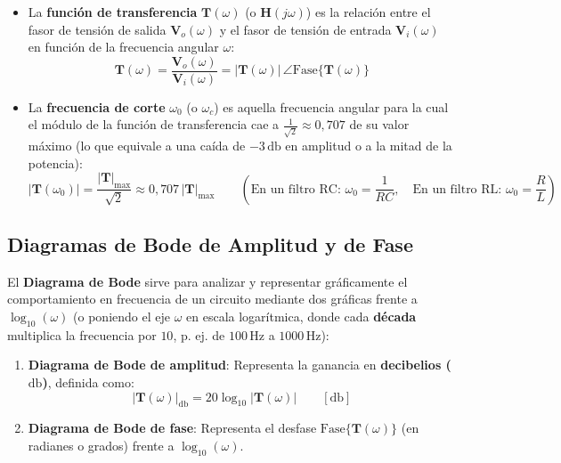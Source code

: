 \begin{definicion}
\begin{itemize}
    \item La \textbf{función de transferencia} $\mathbf{T}(\omega)$ (o $\mathbf{H}(j\omega)$) es la relación entre el fasor de tensión de salida $\mathbf{V}_o(\omega)$ y el fasor de tensión de entrada $\mathbf{V}_i(\omega)$ en función de la frecuencia angular $\omega$:
    \begin{equation}
        \boxed{\mathbf{T}(\omega) = \frac{\mathbf{V}_o(\omega)}{\mathbf{V}_i(\omega)} = |\mathbf{T}(\omega)|\,\angle\text{Fase}\{\mathbf{T}(\omega)\}}
    \end{equation}
    \item La \textbf{frecuencia de corte} $\omega_0$ (o $\omega_c$) es aquella frecuencia angular para la cual el módulo de la función de transferencia cae a $\frac{1}{\sqrt{2}} \approx 0{,}707$ de su valor máximo (lo que equivale a una caída de $-3\,\si{\decibel}$ en amplitud o a la mitad de la potencia):
    \begin{equation}
        |\mathbf{T}(\omega_0)| = \frac{|\mathbf{T}|_{\max}}{\sqrt{2}} \approx 0{,}707\,|\mathbf{T}|_{\max} \qquad \left(\text{En un filtro RC: } \boxed{\omega_0 = \frac{1}{R C}}, \quad \text{En un filtro RL: } \boxed{\omega_0 = \frac{R}{L}}\right)
    \end{equation}
\end{itemize}
\end{definicion}

\subsection{Diagramas de Bode de Amplitud y de Fase}

El \textbf{Diagrama de Bode} sirve para analizar y representar gráficamente el comportamiento en frecuencia de un circuito mediante dos gráficas frente a $\log_{10}(\omega)$ (o poniendo el eje $\omega$ en escala logarítmica, donde cada \textbf{década} multiplica la frecuencia por $10$, p. ej. de $100\,\si{\hertz}$ a $1000\,\si{\hertz}$):
\begin{enumerate}
    \item \textbf{Diagrama de Bode de amplitud}: Representa la ganancia en \textbf{decibelios ($\si{\decibel}$)}, definida como:
    \begin{equation}
        |\mathbf{T}(\omega)|_{\si{\decibel}} = 20\log_{10}|\mathbf{T}(\omega)| \qquad [\si{\decibel}]
    \end{equation}
    \item \textbf{Diagrama de Bode de fase}: Representa el desfase $\text{Fase}\{\mathbf{T}(\omega)\}$ (en radianes o grados) frente a $\log_{10}(\omega)$.
\end{enumerate}

